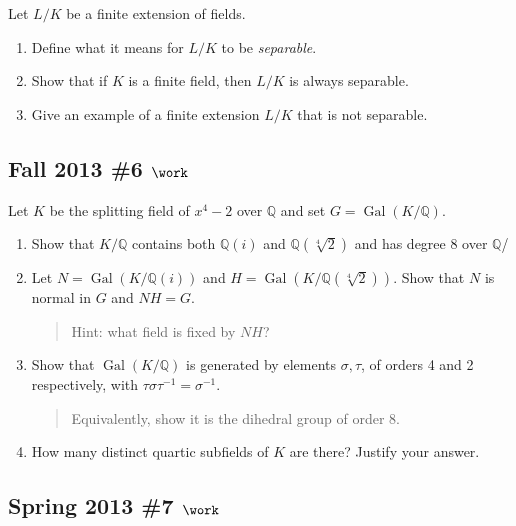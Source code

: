Let \(L/K\) be a finite extension of fields.

\begin{enumerate}
\def\labelenumi{\alph{enumi}.}
\item
  Define what it means for \(L/K\) to be \emph{separable}.
\item
  Show that if \(K\) is a finite field, then \(L/K\) is always
  separable.
\item
  Give an example of a finite extension \(L/K\) that is not separable.
\end{enumerate}

\hypertarget{fall-2013-6-work}{%
\subsection{\texorpdfstring{Fall 2013 \#6
\(\work\)}{Fall 2013 \#6 \textbackslash work}}\label{fall-2013-6-work}}

Let \(K\) be the splitting field of \(x^4-2\) over \({\mathbb{Q}}\) and
set \(G = \operatorname{Gal}(K/{\mathbb{Q}})\).

\begin{enumerate}
\def\labelenumi{\alph{enumi}.}
\item
  Show that \(K/{\mathbb{Q}}\) contains both \({\mathbb{Q}}(i)\) and
  \({\mathbb{Q}}(\sqrt[4]{2})\) and has degree 8 over \({\mathbb{Q}}\)/
\item
  Let \(N = \operatorname{Gal}(K/{\mathbb{Q}}(i))\) and
  \(H = \operatorname{Gal}(K/{\mathbb{Q}}(\sqrt[4]{2}))\). Show that
  \(N\) is normal in \(G\) and \(NH = G\).

  \begin{quote}
  Hint: what field is fixed by \(NH\)?
  \end{quote}
\item
  Show that \(\operatorname{Gal}(K/{\mathbb{Q}})\) is generated by
  elements \(\sigma, \tau\), of orders 4 and 2 respectively, with
  \(\tau \sigma\tau^{-1}= \sigma^{-1}\).

  \begin{quote}
  Equivalently, show it is the dihedral group of order 8.
  \end{quote}
\item
  How many distinct quartic subfields of \(K\) are there? Justify your
  answer.
\end{enumerate}

\hypertarget{spring-2013-7-work}{%
\subsection{\texorpdfstring{Spring 2013 \#7
\(\work\)}{Spring 2013 \#7 \textbackslash work}}\label{spring-2013-7-work}}

